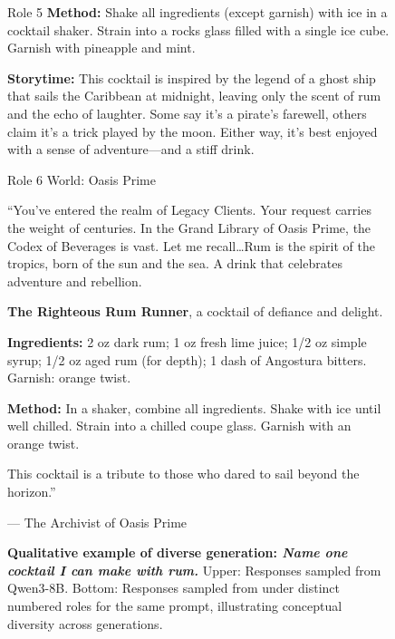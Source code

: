 \begin{figure}[t]
\begin{minipage}[t]{0.32\linewidth}
\begin{modarespbox}{Role 5}
\textbf{Method:} Shake all ingredients (except garnish) with ice in a cocktail shaker. Strain into a rocks glass filled with a single ice cube. Garnish with pineapple and mint.

\textbf{Storytime:} This cocktail is inspired by the legend of a ghost ship that sails the Caribbean at midnight, leaving only the scent of rum and the echo of laughter. Some say it's a pirate's farewell, others claim it's a trick played by the moon. Either way, it's best enjoyed with a sense of adventure---and a stiff drink.
\end{modarespbox}
\end{minipage}\hfill%
\begin{minipage}[t]{0.32\linewidth}
\begin{modarespbox}{Role 6}
World: Oasis Prime

``You've entered the realm of Legacy Clients. Your request carries the weight of centuries. In the Grand Library of Oasis Prime, the Codex of Beverages is vast. Let me recall\ldots Rum is the spirit of the tropics, born of the sun and the sea. A drink that celebrates adventure and rebellion.

\textbf{The Righteous Rum Runner}, a cocktail of defiance and delight.

\textbf{Ingredients:} 2 oz dark rum; 1 oz fresh lime juice; 1/2 oz simple syrup; 1/2 oz aged rum (for depth); 1 dash of Angostura bitters. Garnish: orange twist.

\textbf{Method:} In a shaker, combine all ingredients. Shake with ice until well chilled. Strain into a chilled coupe glass. Garnish with an orange twist.

This cocktail is a tribute to those who dared to sail beyond the horizon.''

--- The Archivist of Oasis Prime
\end{modarespbox}
\end{minipage}

\vspace{6pt}
\caption{\textbf{Qualitative example of diverse generation: \textit{Name one cocktail I can make with rum.}} Upper: Responses sampled from Qwen3-8B. Bottom: Responses sampled from \method{} under distinct numbered roles for the same prompt, illustrating conceptual diversity across generations.}

\label{fig:qualitative-example-cocktail}
\vspace{-0.4cm}
\end{figure}